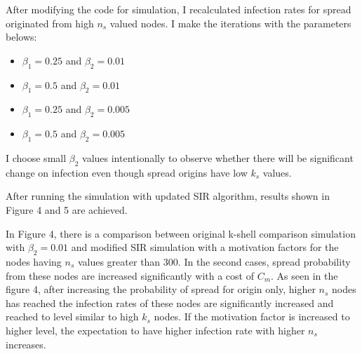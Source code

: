 \documentclass[11pt,a4,twocolumn]{article}
\begin{document}
After modifying the code for simulation, I recalculated infection rates for spread originated from high $n_{s}$ valued nodes. I make the iterations with the parameters belows:

\begin{itemize}
  \item ${\beta}_{1} = 0.25$ and ${\beta}_{2} = 0.01$ 
  \item ${\beta}_{1} = 0.5$ and ${\beta}_{2} = 0.01 $ 
  \item ${\beta}_{1} = 0.25$ and ${\beta}_{2} = 0.005$ 
  \item ${\beta}_{1} = 0.5$ and ${\beta}_{2} = 0.005 $ 
\end{itemize}

I choose small ${\beta}_{2}$ values intentionally to observe whether there will be significant change on infection even though spread origins have low $k_{s}$ values. 

After running the simulation with updated SIR algorithm, results shown in Figure 4 and 5 are achieved. 

In Figure 4, there is a comparison between original k-shell comparison simulation with  ${\beta}_{2} = 0.01$ and modified SIR simulation with a motivation factors for the nodes having  $n_{s}$ values greater than $300$. In the second cases, spread probability from these nodes are increased significantly with a cost of $C_m$. As seen in the figure 4, after increasing the probability of spread for origin only, higher $n_{s}$ nodes has reached the infection rates of these nodes are significantly increased and reached to level similar to high $k_{s}$ nodes. If the motivation factor is increased to higher level, the expectation to have higher infection rate with higher $n_{s}$ increases.
\end{document}
